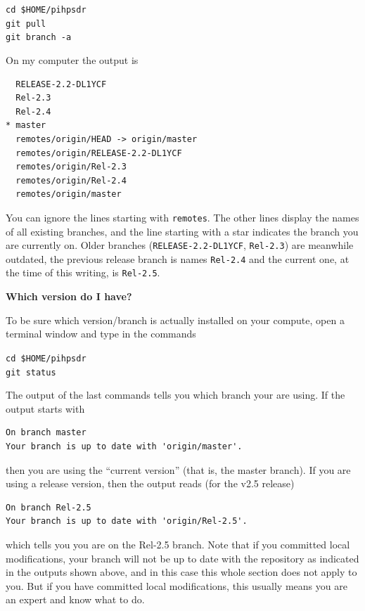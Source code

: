 \documentclass[12pt]{book}
\def\grtt#1{\texttt{\color{magenta}#1}}
\begin{document}
\grtt{cd \$HOME/pihpsdr} \\
\grtt{git pull} \\
\grtt{git branch -a}

On my computer the output is

\begin{verbatim}
  RELEASE-2.2-DL1YCF
  Rel-2.3
  Rel-2.4
* master
  remotes/origin/HEAD -> origin/master
  remotes/origin/RELEASE-2.2-DL1YCF
  remotes/origin/Rel-2.3
  remotes/origin/Rel-2.4
  remotes/origin/master
\end{verbatim}

You can ignore the  lines starting with \texttt{remotes}. The other lines display the names of all
existing branches, and the line starting with a star indicates the branch you are currently on.
Older branches (\texttt{RELEASE-2.2-DL1YCF}, \texttt{Rel-2.3}) are meanwhile outdated, the previous
release branch is names \texttt{Rel-2.4} and the current one, at the time of this writing, is \texttt{Rel-2.5}.

\medskip
\textbf{Which version do I have?}

To be sure which version/branch is actually installed on your compute, open a terminal  window and
type in the commands

\grtt{cd \$HOME/pihpsdr} \\
\grtt{git status}

The output of the last commands tells you which branch your are using. If the output starts
with

\begin{verbatim}
On branch master
Your branch is up to date with 'origin/master'.
\end{verbatim}

then you are using the ``current version'' (that is, the master branch). If you are using a release
version, then the output reads (for the v2.5 release)

\begin{verbatim}
On branch Rel-2.5
Your branch is up to date with 'origin/Rel-2.5'.
\end{verbatim}

which tells you you are on the Rel-2.5 branch. Note that if you committed local modifications,
your branch will not be up to date with the repository as indicated in the outputs shown above,
and in this case this whole section does  not apply  to you. But if you have committed  local
modifications, this usually means you are an expert and know what to do.
\end{document}
